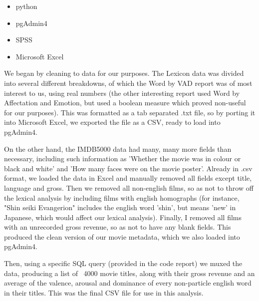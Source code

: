 \documentclass[12pt,a4paper]{article}
\begin{document}
    \begin{itemize}
        \item python
        \item pgAdmin4
        \item SPSS
        \item Microsoft Excel
    \end{itemize}


    We began by cleaning to data for our purposes. The Lexicon data was divided into several different breakdowns, of which the Word by VAD report was of most interest to us, using real numbers (the other interesting report used Word by Affectation and Emotion, but used a boolean measure which proved non-useful for our purposes). This was formatted as a tab separated .txt file, so by porting it into Microsoft Excel, we exported the file as a CSV, ready to load into pgAdmin4.

    On the other hand, the IMDB5000 data had many, many more fields than necessary, including such information as 'Whether the movie was in colour or black and white' and 'How many faces were on the movie poster'. Already in .csv format, we loaded the data in Excel and manually removed all fields except title, language and gross. Then we removed all non-english films, so as not to throw off the lexical analysis by including films with english homographs (for instance, "Shin seiki Evangerion" includes the english word 'shin', but means 'new' in Japanese, which would affect our lexical analysis). Finally, I removed all films with an unrecorded gross revenue, so as not to have any blank fields. This produced the clean version of our movie metadata, which we also loaded into pgAdmin4.

    Then, using a specific SQL query (provided in the code report) we muxed the data, producing a list of ~4000 movie titles, along with their gross revenue and an average of the valence, arousal and dominance of every non-particle english word in their titles. This was the final CSV file for use in this analysis.
\end{document}
